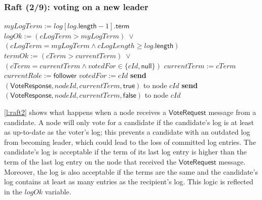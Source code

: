\begin{frame}
    \label{s:raft2}
    \frametitle{Raft (2/9): voting on a new leader}
    \footnotesize
    \begin{algorithmic}
        \State
            \State $\mathit{myLogTerm} := \mathit{log}[\mathit{log}.\mathsf{length} - 1].\mathsf{term}$
            \State $\mathit{logOk} := (\mathit{cLogTerm} > \mathit{myLogTerm}) \;\vee$
            \State \hspace{25pt}$(\mathit{cLogTerm} = \mathit{myLogTerm} \wedge \mathit{cLogLength} \ge \mathit{log}.\mathsf{length})$
            \State
            \State $\mathit{termOk} := (\mathit{cTerm} > \mathit{currentTerm}) \;\vee$
            \State \hspace{25pt}$(\mathit{cTerm} = \mathit{currentTerm} \wedge \mathit{votedFor} \in \{\mathit{cId}, \mathsf{null}\})$
            \State
                \State $\mathit{currentTerm} := \mathit{cTerm}$
                \State $\mathit{currentRole} := \mathsf{follower}$
                \State $\mathit{votedFor} := \mathit{cId}$
                \State \textbf{send} $(\mathsf{VoteResponse}, \mathit{nodeId}, \mathit{currentTerm}, \mathsf{true})$ to node $\mathit{cId}$
            \Else
                \State \textbf{send} $(\mathsf{VoteResponse}, \mathit{nodeId}, \mathit{currentTerm}, \mathsf{false})$ to node $\mathit{cId}$
            \EndIf
        \EndOn
        \State
    \end{algorithmic}
\end{frame}
\label{l:raft2}

\autoref{l:raft2} shows what happens when a node receives a $\mathsf{VoteRequest}$ message from a candidate.
A node will only vote for a candidate if the candidate's log is at least as up-to-date as the voter's log; this prevents a candidate with an outdated log from becoming leader, which could lead to the loss of committed log entries.
The candidate's log is acceptable if the term of its last log entry is higher than the term of the last log entry on the node that received the $\mathsf{VoteRequest}$ message.
Moreover, the log is also acceptable if the terms are the same and the candidate's log contains at least as many entries as the recipient's log.
This logic is reflected in the $\mathit{logOk}$ variable.

